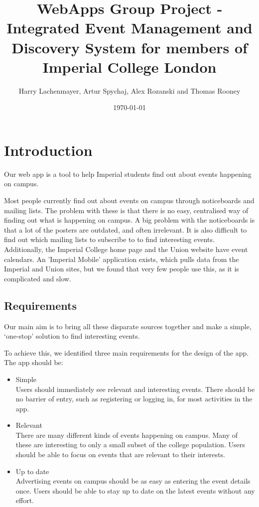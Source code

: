 \documentclass[11pt]{article}
\begin{document}
\title{WebApps Group Project - Integrated Event Management and Discovery System for members of Imperial College London}

\author{Harry Lachenmayer, Artur Spychaj, Alex Rozanski and Thomas Rooney}

\date{\today}         %

\maketitle            %

\section {Introduction}

Our web app is a tool to help Imperial students find out about events happening on campus.

Most people currently find out about events on campus through noticeboards and mailing lists. The problem with these is that there is no easy, centralised way of finding out what is happening on campus. A big problem with the noticeboards is that a lot of the posters are outdated, and often irrelevant. It is also difficult to find out which mailing lists to subscribe to to find interesting events. Additionally, the Imperial College home page and the Union website have event calendars. An 'Imperial Mobile' application exists, which pulls data from the Imperial and Union sites, but we found that very few people use this, as it is complicated and slow.

\subsection{Requirements}

Our main aim is to bring all these disparate sources together and make a simple, `one-stop' solution to find interesting events.

To achieve this, we identified three main requirements for the design of the app. The app should be:

\begin{itemize}
\item Simple \\ Users should immediately see relevant and interesting events. There should be no barrier of entry, such as registering or logging in, for most activities in the app.

\item Relevant \\ There are many different kinds of events happening on campus. Many of these are interesting to only a small subset of the college population. Users should be able to focus on events that are relevant to their interests.

\item Up to date \\ Advertising events on campus should be as easy as entering the event details once. Users should be able to stay up to date on the latest events without any effort.

\end{itemize}
\end{document}
